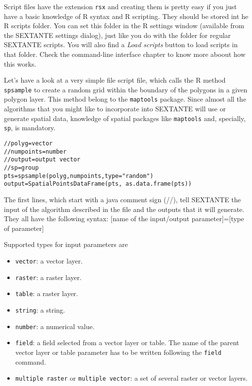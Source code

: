 Script files have the extension \texttt{rsx} and creating them is pretty easy if you just have a basic knowledge of R syntax and R scripting. They should be stored int he R scripts folder. You can set this folder in the R settings window (available from the SEXTANTE settings dialog), just like you do with the folder for regular SEXTANTE scripts. You will also find a \emph{Load scripts} button to load scripts in that folder. Check the command-line interface chapter to know more aboout how this works.

Let's have a look at a very simple file script file, which calls the R method \texttt{spsample} to create a random grid within the boundary of the polygons in a given polygon layer. This method belong to the \texttt{maptools} package. Since almost all the algorithms that you might like to incorporate into SEXTANTE will use or generate spatial data, knowledge of spatial packages like \texttt{maptools} and, specially, \texttt{sp}, is mandatory.

\begin{verbatim}
//polyg=vector
//numpoints=number
//output=output vector
//sp=group
pts=spsample(polyg,numpoints,type="random")
output=SpatialPointsDataFrame(pts, as.data.frame(pts))
\end{verbatim}


The first lines, which start with a java comment sign (//), tell SEXTANTE the input of the algorithm described in the file and the outputs that it will generate. They all have the following syntax: [name of the input/output parameter]=[type of parameter]

Supported types for input parameters are

\begin{itemize}
	\item \texttt{vector}: a vector layer.
	\item \texttt{raster}: a raster layer.
	\item \texttt{table}: a raster layer.
	\item \texttt{string}: a string.
	\item \texttt{number}: a numerical value.
	\item \texttt{field}: a field selected from a vector layer or table. The name of the parent vector layer or table parameter has to be written following the \texttt{field} command.
	\item \texttt{multiple raster} or \texttt{multiple vector}: a set of several raster or vector layers.
\end{itemize}

